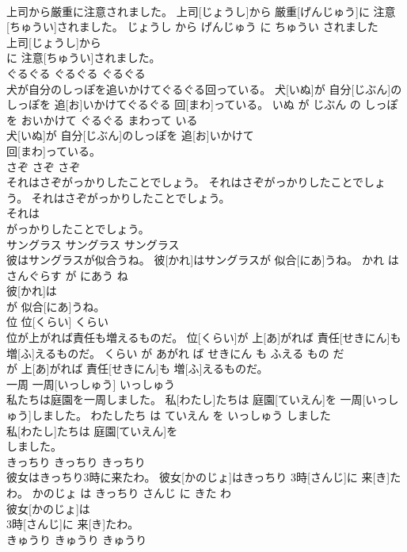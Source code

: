 \documentclass[8pt]{extreport}
\begin{document}
\begin{CJK}{UTF8}{min}
\\	上司から厳重に注意されました。	上司[じょうし]から 厳重[げんじゅう]に 注意[ちゅうい]されました。	じょうし から げんじゅう に ちゅうい されました	
\\	上司[じょうし]から
\\	に 注意[ちゅうい]されました。			
\\	ぐるぐる	ぐるぐる	ぐるぐる	
\\	犬が自分のしっぽを追いかけてぐるぐる回っている。	犬[いぬ]が 自分[じぶん]のしっぽを 追[お]いかけてぐるぐる 回[まわ]っている。	いぬ が じぶん の しっぽ を おいかけて ぐるぐる まわって いる	
\\	犬[いぬ]が 自分[じぶん]のしっぽを 追[お]いかけて
\\	回[まわ]っている。			
\\	さぞ	さぞ	さぞ	
\\	それはさぞがっかりしたことでしょう。	それはさぞがっかりしたことでしょう。	それはさぞがっかりしたことでしょう。	
\\	それは
\\	がっかりしたことでしょう。			
\\	サングラス	サングラス	サングラス	
\\	彼はサングラスが似合うね。	彼[かれ]はサングラスが 似合[にあ]うね。	かれ は さんぐらす が にあう ね	
\\	彼[かれ]は
\\	が 似合[にあ]うね。			
\\	位	位[くらい]	くらい	
\\	位が上がれば責任も増えるものだ。	位[くらい]が 上[あ]がれば 責任[せきにん]も 増[ふ]えるものだ。	くらい が あがれ ば せきにん も ふえる もの だ	
\\	が 上[あ]がれば 責任[せきにん]も 増[ふ]えるものだ。			
\\	一周	一周[いっしゅう]	いっしゅう	
\\	私たちは庭園を一周しました。	私[わたし]たちは 庭園[ていえん]を 一周[いっしゅう]しました。	わたしたち は ていえん を いっしゅう しました	
\\	私[わたし]たちは 庭園[ていえん]を
\\	しました。			
\\	きっちり	きっちり	きっちり	
\\	彼女はきっちり3時に来たわ。	彼女[かのじょ]はきっちり 3時[さんじ]に 来[き]たわ。	かのじょ は きっちり さんじ に きた わ	
\\	彼女[かのじょ]は
\\	3時[さんじ]に 来[き]たわ。			
\\	きゅうり	きゅうり	きゅうり	

\end{CJK}
\end{document}
